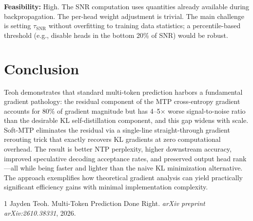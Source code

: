 \documentclass[11pt,a4paper]{article}
\begin{document}
\textbf{Feasibility:} High. The SNR computation uses quantities already available during backpropagation. The per-head weight adjustment is trivial. The main challenge is setting $\tau_{\mathrm{SNR}}$ without overfitting to training data statistics; a percentile-based threshold (e.g., disable heads in the bottom 20\% of SNR) would be robust.

\section{Conclusion}
Teoh demonstrates that standard multi-token prediction harbors a fundamental gradient pathology: the residual component of the MTP cross-entropy gradient accounts for 80\% of gradient magnitude but has 4--5$\times$ worse signal-to-noise ratio than the desirable KL self-distillation component, and this gap widens with scale. Soft-MTP eliminates the residual via a single-line straight-through gradient rerouting trick that exactly recovers KL gradients at zero computational overhead. The result is better NTP perplexity, higher downstream accuracy, improved speculative decoding acceptance rates, and preserved output head rank---all while being faster and lighter than the naive KL minimization alternative. The approach exemplifies how theoretical gradient analysis can yield practically significant efficiency gains with minimal implementation complexity.


\begin{thebibliography}{1}
Jayden Teoh.
\newblock Multi-Token Prediction Done Right.
\newblock \emph{arXiv preprint arXiv:2610.38331}, 2026.
\end{thebibliography}
\end{document}

